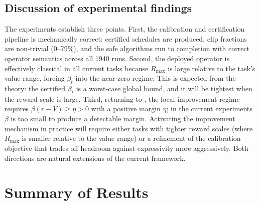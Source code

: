 \documentclass{article}
\theoremstyle{remark}
\begin{document}
\subsection{Discussion of experimental findings}
\label{sec:exp-discussion}

The experiments establish three points.
First, the calibration and certification pipeline is mechanically correct: certified schedules are produced, clip fractions are non-trivial (0--79\%), and the safe algorithms run to completion with correct operator semantics across all 1940 runs.
Second, the deployed operator is effectively classical in all current tasks because $R_{\max}$ is large relative to the task's value range, forcing $\overline\beta_t$ into the near-zero regime.
This is expected from the theory: the certified $\overline\beta_t$ is a worst-case global bound, and it will be tightest when the reward scale is large.
Third, returning to , the local improvement regime requires $\beta(r-V)\ge\eta>0$ with a positive margin $\eta$; in the current experiments $\widetilde\beta$ is too small to produce a detectable margin.
Activating the improvement mechanism in practice will require either tasks with tighter reward scales (where $R_{\max}$ is smaller relative to the value range) or a refinement of the calibration objective that trades off headroom against expressivity more aggressively.
Both directions are natural extensions of the current framework.
\fi %

\clearpage
\section{Summary of Results}
\label{sec:summary}
\end{document}
